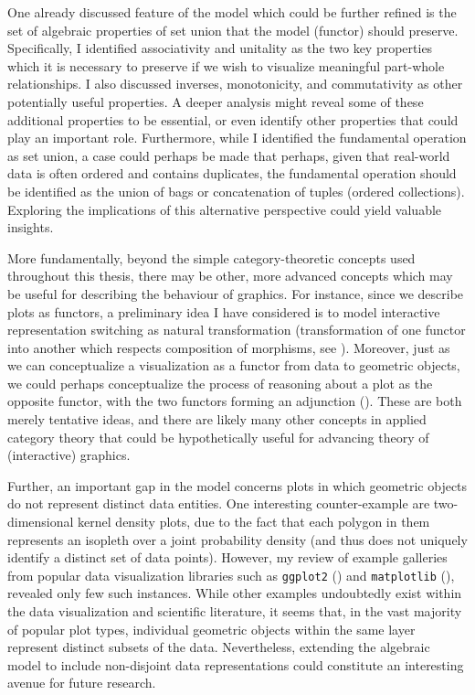 \documentclass[
  openany]{book}
\theoremstyle{definition}
\theoremstyle{definition}
\theoremstyle{definition}
\theoremstyle{definition}
\theoremstyle{remark}
\begin{document}
One already discussed feature of the model which could be further refined is the set of algebraic properties of set union that the model (functor) should preserve. Specifically, I identified associativity and unitality as the two key properties which it is necessary to preserve if we wish to visualize meaningful part-whole relationships. I also discussed inverses, monotonicity, and commutativity as other potentially useful properties. A deeper analysis might reveal some of these additional properties to be essential, or even identify other properties that could play an important role. Furthermore, while I identified the fundamental operation as set union, a case could perhaps be made that perhaps, given that real-world data is often ordered and contains duplicates, the fundamental operation should be identified as the union of bags or concatenation of tuples (ordered collections). Exploring the implications of this alternative perspective could yield valuable insights.

More fundamentally, beyond the simple category-theoretic concepts used throughout this thesis, there may be other, more advanced concepts which may be useful for describing the behaviour of graphics. For instance, since we describe plots as functors, a preliminary idea I have considered is to model interactive representation switching as natural transformation (transformation of one functor into another which respects composition of morphisms, see ). Moreover, just as we can conceptualize a visualization as a functor from data to geometric objects, we could perhaps conceptualize the process of reasoning about a plot as the opposite functor, with the two functors forming an adjunction (). These are both merely tentative ideas, and there are likely many other concepts in applied category theory that could be hypothetically useful for advancing theory of (interactive) graphics.

Further, an important gap in the model concerns plots in which geometric objects do not represent distinct data entities. One interesting counter-example are two-dimensional kernel density plots, due to the fact that each polygon in them represents an isopleth over a joint probability density (and thus does not uniquely identify a distinct set of data points). However, my review of example galleries from popular data visualization libraries such as \texttt{ggplot2} () and \texttt{matplotlib} (), revealed only few such instances. While other examples undoubtedly exist within the data visualization and scientific literature, it seems that, in the vast majority of popular plot types, individual geometric objects within the same layer represent distinct subsets of the data. Nevertheless, extending the algebraic model to include non-disjoint data representations could constitute an interesting avenue for future research.
\end{document}
